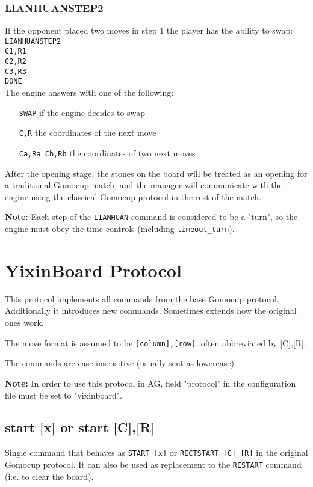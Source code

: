 \documentclass[12pt,a4paper]{article}
\begin{document}
\subsubsection{LIANHUANSTEP2}
If the opponent placed two moves in step 1 the player has the ability to swap:\\
\texttt{LIANHUANSTEP2}\\
\texttt{C1,R1}\\
\texttt{C2,R2}\\
\texttt{C3,R3}\\
\texttt{DONE}\\
The engine answers with one of the following:
\begin{enumerate}[leftmargin=7.5em]
\item[\texttt{SWAP}]{if the engine decides to swap}
\item[\texttt{C,R}]{the coordinates of the next move}
\item[\texttt{Ca,Ra Cb,Rb}]{the coordinates of two next moves}
\end{enumerate}

After the opening stage, the stones on the board will be treated as an opening for a traditional Gomocup match, and the manager will communicate with the engine using the classical Gomocup protocol in the rest of the match.

\textbf{Note:} Each step of the \texttt{LIANHUAN} command is considered to be a "turn", so the engine must obey the time controls (including \texttt{timeout{\_}turn}).



\newpage
\section{YixinBoard Protocol}
This protocol implements all commands from the base Gomocup protocol. Additionally it introduces new commands. Sometimes extends how the original ones work.

The move format is assumed to be \texttt{[column],[row]}, often abbreviated by [C],[R].

The commands are case-insensitive (usually sent as lowercase).

\textbf{Note:} In order to use this protocol in AG, field "protocol" in the configuration file must be set to "yixinboard".

\subsection{start [x] or start [C],[R]}
\label{cmd_yxstart}
Single command that behaves as \texttt{START [x]} or \texttt{RECTSTART [C] [R]} in the original Gomocup protocol. It can also be used as replacement to the \texttt{RESTART} command (i.e. to clear the board).
\end{document}
